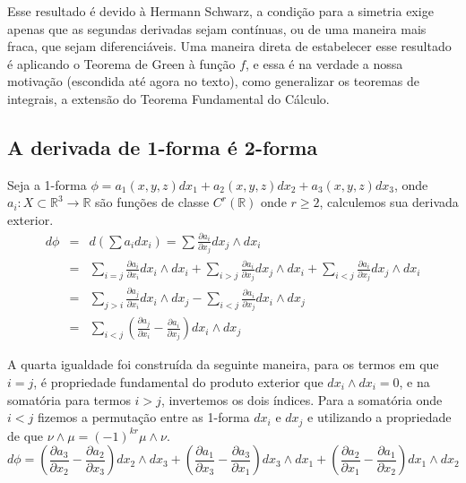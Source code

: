 Esse resultado é devido à Hermann Schwarz, a condição para a 
simetria exige apenas que as segundas derivadas sejam contínuas, 
ou de uma maneira mais fraca, que sejam diferenciáveis. Uma maneira direta de estabelecer esse resultado é aplicando o Teorema de Green à função $f$, e essa é na verdade a nossa motivação (escondida até agora no texto), como generalizar os teoremas de integrais, a extensão do Teorema Fundamental do Cálculo. 




\subsection{A derivada de 1-forma é 2-forma} 

Seja a 1-forma $\phi = a_1(x,y,z)dx_1 + a_2(x,y,z)dx_2 + a_3(x,y,z)dx_3$, onde $a_i:X\subset \mathbb{R}^3 \to \mathbb{R}$ são funções de classe $C^r(\mathbb{R})$ onde $r \geq 2$, calculemos sua derivada exterior.
%
\begin{eqnarray*}
d\phi &=& d\left(\sum a_i dx_i \right) = 
\sum \frac{\partial a_i}{\partial x_j} dx_j \wedge dx_i                
\\ 
      &=& \sum_{i=j} \frac{\partial a_i}{\partial x_i} dx_i 
\wedge dx_i + \sum_{i>j} \frac{\partial a_i}{\partial x_j} dx_j 
\wedge dx_i
      + \sum_{i<j} \frac{\partial a_i}{\partial x_j} dx_j 
\wedge dx_i 
\\
      &=& \sum_{j>i} \frac{\partial a_j}{\partial x_i} dx_i 
\wedge dx_j - \sum_{i<j} \frac{\partial a_i}{\partial x_j} dx_i 
\wedge dx_j 
\\
      &=& \sum_{i<j} \left(\frac{\partial a_j}{\partial x_i} 
- \frac{\partial a_i}{\partial x_j}\right)dx_i \wedge dx_j
\end{eqnarray*}

A quarta igualdade foi construída da seguinte maneira, para 
os termos em que $i=j$, é propriedade fundamental do produto 
exterior que $dx_i \wedge dx_i = 0$, e na somatória para 
termos $i > j$, invertemos os dois índices. Para a somatória 
onde $i < j$ fizemos a permutação entre as 1-forma $dx_i$ e 
$dx_j$ e utilizando a propriedade de que $\nu \wedge \mu 
= (-1)^{kr} \mu \wedge \nu$.
%
\[
d\phi = \left(\frac{\partial a_3}{\partial x_2} 
- \frac{\partial a_2}{\partial x_3}\right) dx_2 \wedge dx_3 
+ \left(\frac{\partial a_1}{\partial x_3} 
- \frac{\partial a_3}{\partial x_1}\right) dx_3 \wedge dx_1
+ \left(\frac{\partial a_2}{\partial x_1} 
- \frac{\partial a_1}{\partial x_2}\right) dx_1 \wedge dx_2
\]


